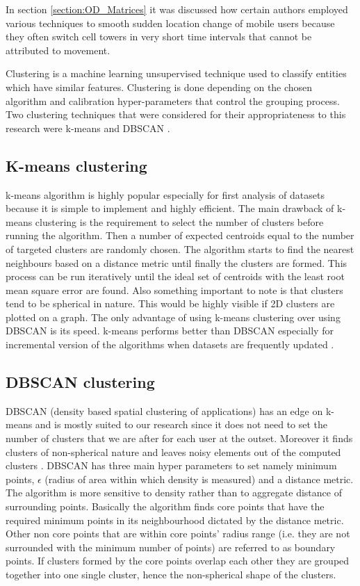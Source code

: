 \documentclass[12pt, a4paper]{report}
\theoremstyle{definition}
\theoremstyle{definition}%
\theoremstyle{definition}%
\theoremstyle{definition}%
\theoremstyle{definition}%
\theoremstyle{definition}%
\begin{document}
In section \ref{section:OD_Matrices} it was discussed how certain authors employed various techniques to smooth sudden location change of mobile users because they often switch cell towers in very short time intervals that cannot be attributed to movement. 
 
Clustering is a machine learning unsupervised technique used to classify entities which have similar features. Clustering is done depending on the chosen algorithm and calibration hyper-parameters that control the grouping process. Two clustering techniques that were considered for their appropriateness to this research were k-means and DBSCAN \cite{ChakrabortyNKNagwaniLopamudraDey2011,huang2017research}. 

\subsection{K-means clustering} \label{subsection:methodology:kmeans_clustering}
k-means algorithm is highly popular especially for first analysis of datasets because it is simple to implement and highly efficient. The main drawback of k-means clustering is the requirement to select the number of clusters before running the algorithm. Then a number of expected centroids equal to the number of targeted clusters are randomly chosen. The algorithm starts to find the nearest neighbours based on a distance metric until finally the clusters are formed. This process can be run iteratively until the ideal set of centroids with the least root mean square error are found. Also something important to note is that clusters tend to be spherical in nature. This would be highly visible if 2D clusters are plotted on a graph. The only advantage of using k-means clustering over using DBSCAN is its speed. k-means performs better than DBSCAN especially for incremental version of the algorithms when datasets are frequently updated \cite{ChakrabortyNKNagwaniLopamudraDey2011}.

\subsection{DBSCAN clustering}  \label{subsection:methodology:dbscan_clustering}
DBSCAN (density based spatial clustering of applications) has an edge on k-means and is mostly suited to our research since it does not need to set the number of clusters that we are after for each user at the outset. Moreover it finds clusters of non-spherical nature and leaves noisy elements out of the computed clusters \cite{ChakrabortyNKNagwaniLopamudraDey2011}. DBSCAN has three main hyper parameters to set namely minimum points,  $\epsilon$ (radius of area within which density is measured)  and a distance metric. The algorithm is more sensitive to density rather than to aggregate distance of surrounding points. Basically the algorithm finds core points that have the required minimum points in its neighbourhood dictated by the distance metric. Other non core points that are within core points' radius range (i.e. they are not surrounded with the minimum number of points) are referred to as boundary points. If clusters formed by the core points overlap each other they are grouped together into one single cluster, hence the non-spherical shape of the clusters.
\end{document}
